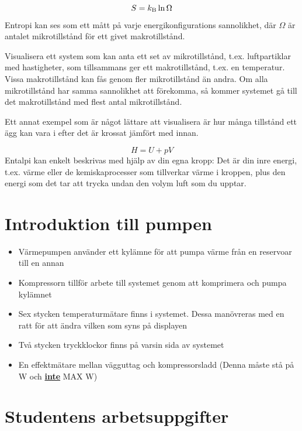 \documentclass[11pt]{article}
\begin{document}
\begin{equation}
    S = k_\text B \ln \Omega
\end{equation}
Entropi kan ses som ett mått på varje energikonfigurations sannolikhet, där $\Omega$ är antalet mikrotillstånd för ett givet makrotillstånd.

Visualisera ett system som kan anta ett set av mikrotillstånd, t.ex. luftpartiklar med hastigheter, som tillsammans ger ett makrotillstånd, t.ex. en temperatur. Vissa makrotillstånd kan fås genom fler mikrotillstånd än andra. Om alla mikrotillstånd har samma sannolikhet att förekomma, så kommer systemet gå till det makrotillstånd med flest antal mikrotillstånd.

Ett annat exempel som är något lättare att visualisera är hur många tillstånd ett ägg kan vara i efter det är krossat jämfört med innan.

\begin{equation}
    H = U + pV
\end{equation}
Entalpi kan enkelt beskrivas med hjälp av din egna kropp: Det är din inre energi, t.ex. värme eller de kemiskaprocesser som tillverkar värme i kroppen, plus den energi som det tar att trycka undan den volym luft som du upptar.  


\section{Introduktion till pumpen}

\begin{itemize}
    \item Värmepumpen använder ett kylämne för att pumpa värme från en reservoar till en annan
    \item Kompressorn tillför arbete till systemet genom att komprimera och pumpa kylämnet
    \item Sex stycken temperaturmätare finns i systemet. Dessa manövreras med en ratt för att ändra vilken som syns på displayen
    \item Två stycken tryckklockor finns på varsin sida av systemet  
    \item En effektmätare mellan vägguttag och kompressorsladd (Denna måste stå på W och \underline{\textbf{inte}} MAX W)
\end{itemize}

\section{Studentens arbetsuppgifter}
\end{document}
